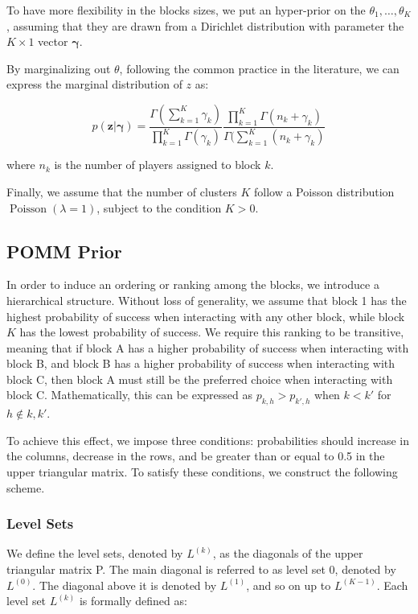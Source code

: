 \documentclass[11pt]{amsart}
\begin{document}
To have more flexibility in the blocks sizes, we put an hyper-prior on the $\theta_1, \dots, \theta_K$, assuming that they are drawn from a Dirichlet distribution with parameter the $K\times1$ vector $\boldsymbol{\gamma}$.


By marginalizing out $\theta$, following the common practice in the literature, we can express the marginal distribution of $z$ as:

\begin{equation} p(\mathbf{z}|\boldsymbol{\gamma}) = \frac{\Gamma(\sum_{k=1}^K \gamma_k)}{\prod_{k=1}^K \Gamma(\gamma_k)}\frac{\prod_{k=1}^K \Gamma(n_k+\gamma_k)}{\Gamma(\sum_{k=1}^K (n_k+\gamma_k)}
\end{equation}

where $n_k$ is the number of players assigned to block $k$.

Finally, we assume that the number of clusters $K$ follow a Poisson distribution $\operatorname{Poisson}(\lambda=1)$, subject to the condition $K>0$.




\subsection{POMM Prior}

In order to induce an ordering or ranking among the blocks, we introduce a hierarchical structure. Without loss of generality, we assume that block 1 has the highest probability of success when interacting with any other block, while block $K$ has the lowest probability of success. We require this ranking to be transitive, meaning that if block A has a higher probability of success when interacting with block B, and block B has a higher probability of success when interacting with block C, then block A must still be the preferred choice when interacting with block C. Mathematically, this can be expressed as $p_{k,h} > p_{k',h}$ when $k < k'$ for $h \notin { k, k' }$.

To achieve this effect, we impose three conditions: probabilities should increase in the columns, decrease in the rows, and be greater than or equal to 0.5 in the upper triangular matrix. To satisfy these conditions, we construct the following scheme.

\subsubsection{Level Sets}

We define the level sets, denoted by $L^{(k)}$, as the diagonals of the upper triangular matrix P. The main diagonal is referred to as level set 0, denoted by $L^{(0)}$. The diagonal above it is denoted by $L^{(1)}$, and so on up to $L^{(K-1)}$. Each level set $L^{(k)}$ is formally defined as:
\end{document}
